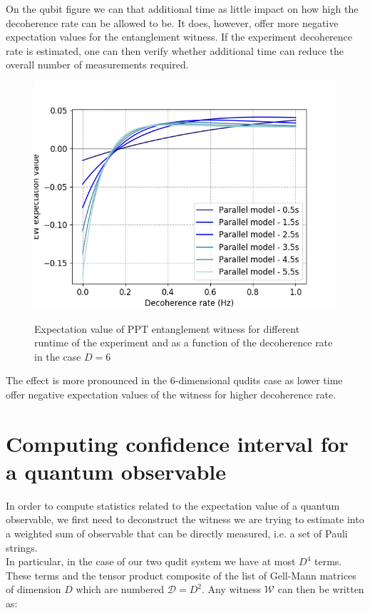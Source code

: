 \documentclass[%
 reprint,
 superscriptaddress,
 amsmath,
 amssymb,
 aps,
 longbibliography
]{revtex4-2}
\begin{document}
\begin{appendices}
\indent On the qubit figure we can that additional time as little impact on how high the decoherence rate can be allowed to be. It does, however, offer more negative expectation values for the entanglement witness. If the experiment decoherence rate is estimated, one can then verify whether additional time can reduce the overall number of measurements required.
	\begin{figure}
	\centering
		\includegraphics[width=1.0\columnwidth]{EW_para_deco_diff_time_d6.png}\par\medskip
		\caption{Expectation value of PPT entanglement witness for different runtime of the experiment and as a function of the decoherence rate in the case $D=6$}\label{fig:deco_para_runtime6}
	\textit{}
	\end{figure}	

\indent The effect is more pronounced in the 6-dimensional qudits case as lower time offer negative expectation values of the witness for higher decoherence rate. 

\section{Computing confidence interval for a quantum observable} \label{sec:stats}

\indent In order to compute statistics related to the expectation value of a quantum observable, we first need to deconstruct the witness we are trying to estimate into a weighted sum of observable that can be directly measured, i.e. a set of Pauli strings. \\
\indent In particular, in the case of our two qudit system we have at most $D^4$ terms. These terms and the tensor product composite of the list of Gell-Mann matrices of dimension $D$ which are numbered $\mathcal{D} = D^2$. Any witness $\mathcal{W}$ can then be written as: 


\end{appendices}
\end{document}
